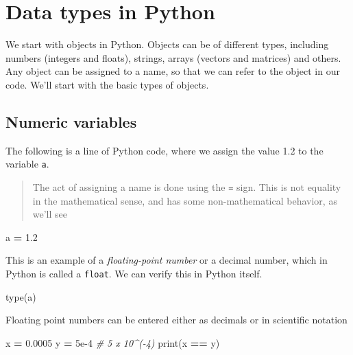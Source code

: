 \documentclass[
  letterpaper,
]{scrbook}
\newenvironment{Shaded}{\begin{snugshade}}{\end{snugshade}}
\newcommand{\BuiltInTok}[1]{#1}
\newcommand{\CommentTok}[1]{\textcolor[rgb]{0.56,0.35,0.01}{\textit{#1}}}
\newcommand{\FloatTok}[1]{\textcolor[rgb]{0.00,0.00,0.81}{#1}}
\newcommand{\NormalTok}[1]{#1}
\newcommand{\OperatorTok}[1]{\textcolor[rgb]{0.81,0.36,0.00}{\textbf{#1}}}
\begin{document}
\hypertarget{data-types-in-python}{%
\section{Data types in Python}\label{data-types-in-python}}

We start with objects in Python. Objects can be of different types, including numbers (integers and floats), strings, arrays (vectors and matrices) and others. Any object can be assigned to a name, so that we can refer to the object in our code. We'll start with the basic types of objects.

\hypertarget{numeric-variables}{%
\subsection{Numeric variables}\label{numeric-variables}}

The following is a line of Python code, where we assign the value 1.2 to the variable \texttt{a}.

\begin{quote}
The act of assigning a name is done using the \texttt{=} sign. This is not equality in the mathematical sense, and has some non-mathematical behavior, as we'll see
\end{quote}

\begin{Shaded}
\begin{Highlighting}[]
\NormalTok{a }\OperatorTok{=} \FloatTok{1.2}
\end{Highlighting}
\end{Shaded}

This is an example of a \emph{floating-point number} or a decimal number, which in Python is called a \texttt{float}. We can verify this in Python itself.

\begin{Shaded}
\begin{Highlighting}[]
\BuiltInTok{type}\NormalTok{(a)}
\end{Highlighting}
\end{Shaded}

Floating point numbers can be entered either as decimals or in scientific notation

\begin{Shaded}
\begin{Highlighting}[]
\NormalTok{x }\OperatorTok{=} \FloatTok{0.0005}
\NormalTok{y }\OperatorTok{=} \FloatTok{5e{-}4} \CommentTok{\# 5 x 10\^{}({-}4)}
\BuiltInTok{print}\NormalTok{(x }\OperatorTok{==}\NormalTok{ y)}
\end{Highlighting}
\end{Shaded}
\end{document}
